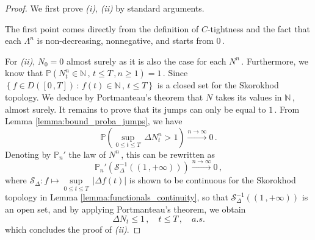 \documentclass{article}
\newcommand{\N}{\mathbb{N}}
\newcommand{\1}{\mathbbm{1}}
\numberwithin{equation}{section}
\begin{document}
\begin{proof}
    We first prove \textit{(i)}, \textit{(ii)} by standard arguments.

    The first point comes directly from the definition of $C$-tightness and the fact that each $\Lambda^n$ is non-decreasing, nonnegative, and starts from $0\,$.

    For \textit{(ii)}, $N_0 = 0$ almost surely as it is also the case for each $N^n\,$. Furthermore, we know that $\mathbb P \left(N^n_t \in \mathbb N\,,\,t \leq T\,, n \geq 1\right) = 1\,$. Since $\left\{f \in D([0\,,T])\,:\, f(t) \in \mathbb N\,,\, t \leq T \right\}$ is a closed set for the Skorokhod topology. We deduce by Portmanteau's theorem that $N$ takes its values in $\N\,$, almost surely. It remains to prove that its jumps can only be equal to $1\,$. From Lemma \ref{lemma:bound_proba_jumps}, we have
    $$
    \mathbb P \left(\sup_{0 \leq t \leq T}\, \Delta N^n_t > 1 \right) \overset{n \to \infty}{\longrightarrow} 0\,.
    $$
    Denoting by $\mathbb P_n'$ the law of $N^n\,$, this can be rewritten as 
    $$
    \mathbb P_n'\left(\mathcal S_{\Delta}^{-1}((1\,, + \infty)) \right) \overset{n \to \infty}{\longrightarrow} 0\,,
    $$
    where $\mathcal S_{\Delta} : f \mapsto \sup\limits_{0 \leq t \leq T}\,\left|\Delta f(t)\right|$ is shown to be continuous for the Skorokhod topology in Lemma \ref{lemma:functionals_continuity}, so that $\mathcal S_{\Delta}^{-1}((1\,, + \infty))$ is an open set, and by applying Portmanteau's theorem, we obtain
    $$
    \Delta N_t \leq 1\,, \quad t \leq T\,, \quad a.s.
    $$
    which concludes the proof of \textit{(ii)}.
    
    
    
    
    



\end{proof}
\end{document}
